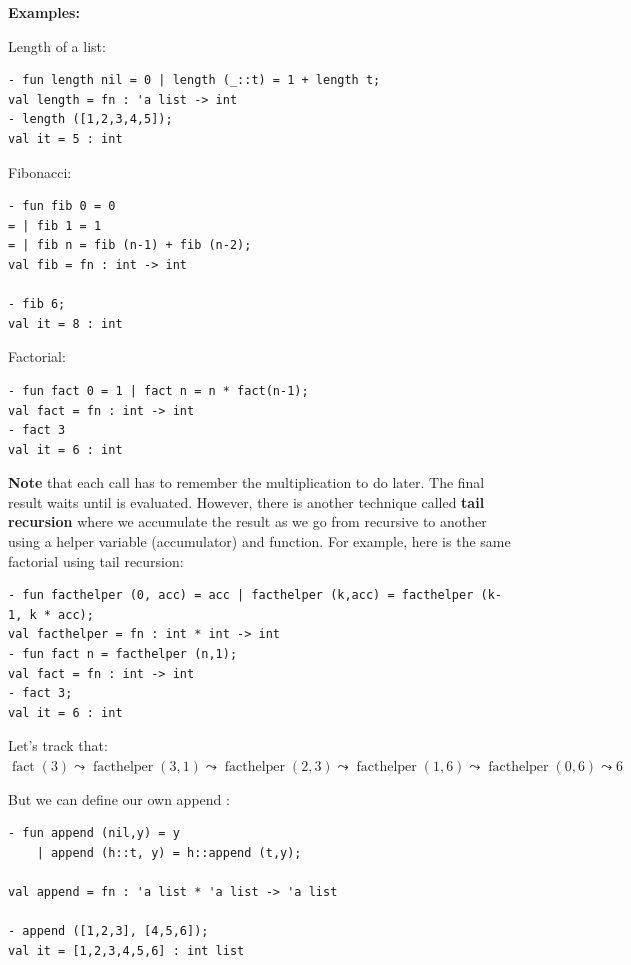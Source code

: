 \textbf{Examples:}

Length of a list:
\begin{verbatim}
- fun length nil = 0 | length (_::t) = 1 + length t;
val length = fn : 'a list -> int
- length ([1,2,3,4,5]);
val it = 5 : int
\end{verbatim}

Fibonacci:
\begin{verbatim}
- fun fib 0 = 0
= | fib 1 = 1
= | fib n = fib (n-1) + fib (n-2);
val fib = fn : int -> int

- fib 6;
val it = 8 : int
\end{verbatim}


Factorial:
\begin{verbatim}
- fun fact 0 = 1 | fact n = n * fact(n-1);
val fact = fn : int -> int
- fact 3
val it = 6 : int
\end{verbatim}
\textbf{Note} that each  call has to remember the multiplication to do later. The final result waits until  is evaluated. However, there is another  technique called \textbf{tail recursion} where we accumulate the result as we go from recursive to another using a helper variable (accumulator) and function. For example, here is the same factorial  using tail recursion:
\begin{verbatim}
- fun facthelper (0, acc) = acc | facthelper (k,acc) = facthelper (k-1, k * acc);
val facthelper = fn : int * int -> int
- fun fact n = facthelper (n,1);
val fact = fn : int -> int
- fact 3;
val it = 6 : int
\end{verbatim}
Let's track that:
$\operatorname{fact}(3) \leadsto \operatorname{facthelper}(3,1) \leadsto \operatorname{facthelper}(2, 3) \leadsto \operatorname{facthelper}(1, 6) \leadsto \operatorname{facthelper}(0,6) \leadsto 6$






But we can define our own append :
\begin{verbatim}
- fun append (nil,y) = y 
    | append (h::t, y) = h::append (t,y);

val append = fn : 'a list * 'a list -> 'a list

- append ([1,2,3], [4,5,6]);
val it = [1,2,3,4,5,6] : int list
\end{verbatim}

